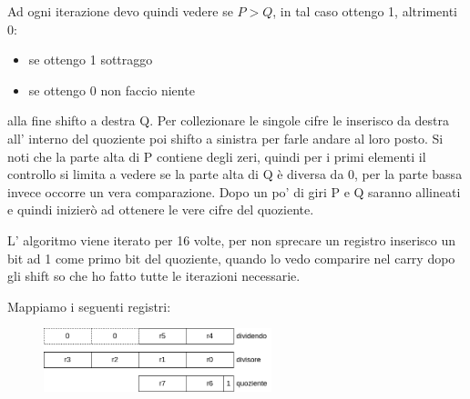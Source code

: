 Ad ogni iterazione devo quindi vedere se $P > Q$, in tal caso ottengo 1, altrimenti 0:
\begin{itemize}
    \item se ottengo 1 sottraggo
    \item se ottengo 0 non faccio niente
\end{itemize}
alla fine shifto a destra Q.
Per collezionare le singole cifre le inserisco da destra all' interno del quoziente poi shifto a sinistra per farle andare al loro posto.
Si noti che la parte alta di P contiene degli zeri, quindi per i primi elementi il controllo si limita a vedere se la parte alta di Q è diversa da 0, per la parte bassa invece occorre un vera comparazione.
Dopo un po' di giri P e Q saranno allineati e quindi inizierò ad ottenere le vere cifre del quoziente.

L' algoritmo viene iterato per 16 volte, per non sprecare un registro inserisco un bit ad 1 come primo bit del quoziente, quando lo vedo comparire nel carry dopo gli shift so che ho fatto tutte le iterazioni necessarie.

Mappiamo i seguenti registri:
\begin{figure}[H]
    \centering
    \includegraphics[width=250px]{images/12_Divisione_efficiente/divisione_fast_registri.png}
\end{figure}

